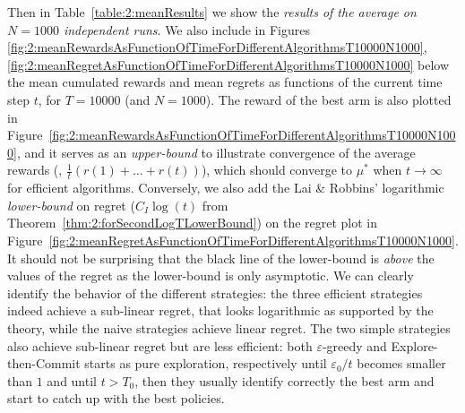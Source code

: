 Then in Table~\ref{table:2:meanResults} we show the \emph{results of the average on $N=1000$ independent runs}.
%
%
We also include in Figures
\ref{fig:2:meanRewardsAsFunctionOfTimeForDifferentAlgorithmsT10000N1000}, \ref{fig:2:meanRegretAsFunctionOfTimeForDifferentAlgorithmsT10000N1000} below the mean cumulated rewards and mean regrets as functions of the current time step $t$, for $T=10000$ (and $N=1000$).
The reward of the best arm is also plotted in Figure~\ref{fig:2:meanRewardsAsFunctionOfTimeForDifferentAlgorithmsT10000N1000}, and it serves as an \emph{upper-bound} to illustrate convergence
of the average rewards
(\ie, $\frac{1}{t} (r(1) + \dots + r(t))$),
which should converge to $\mu^*$ when $t\to\infty$ for efficient algorithms.
Conversely, we also add the Lai \& Robbins' logarithmic \emph{lower-bound} on regret ($C_I \log(t)$ from Theorem~\ref{thm:2:forSecondLogTLowerBound}) on the regret plot in Figure~\ref{fig:2:meanRegretAsFunctionOfTimeForDifferentAlgorithmsT10000N1000}. It should not be surprising that the black line of the lower-bound is \emph{above} the values of the regret as the lower-bound is only asymptotic.
%
We can clearly identify the behavior of the different strategies:
the three efficient strategies indeed achieve a sub-linear regret, that looks logarithmic as supported by the theory,
while the naive strategies achieve linear regret.
The two simple strategies also achieve sub-linear regret but are less efficient:
both $\varepsilon$-greedy and Explore-then-Commit starts as pure exploration, respectively until $\varepsilon_0/t$ becomes smaller than $1$ and until $t > T_0$, then they usually identify correctly the best arm and start to catch up with the best policies.


